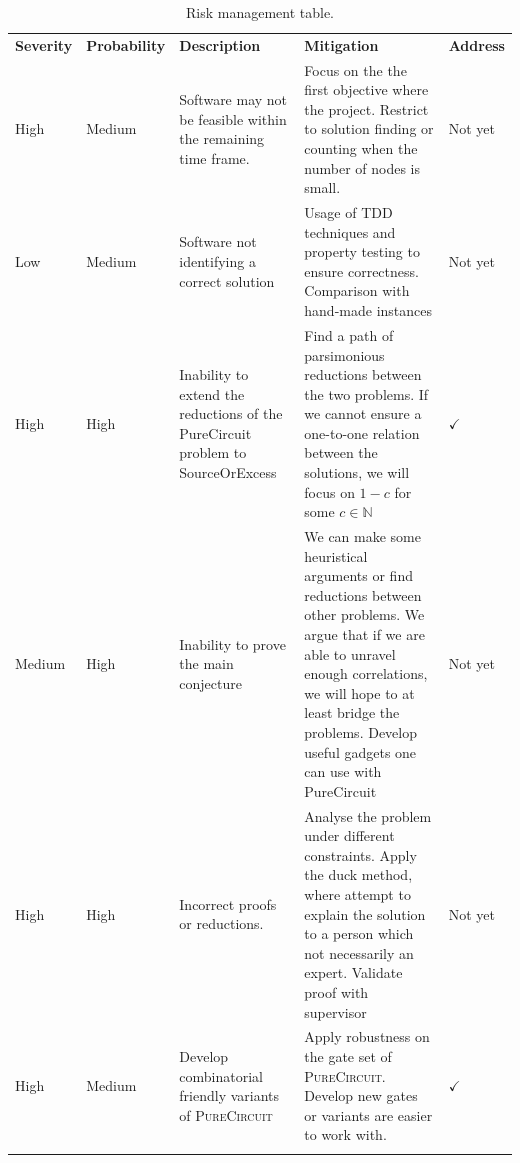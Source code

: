 \begin{xltabular}{0.95\linewidth}{|Z{1.2cm}|Z{1.75cm}|Y|Y|Z{1.2cm}|}
        \hline
        \textbf{Severity} & \textbf{Probability} & \textbf{Description} & \textbf{Mitigation} & \textbf{Address} \\
        \hhline{|=|=|=|=|=|}
        High   & Medium & Software may not be feasible within the remaining time frame. & Focus on the the first objective where the project. Restrict to solution finding or counting when the number of nodes is small. & Not yet      \\ \hline
        Low    & Medium & Software not identifying a correct solution & Usage of TDD techniques and property testing to ensure correctness.  Comparison with hand-made instances & Not yet      \\ \hline
        High   & High   & Inability to extend the reductions of the PureCircuit problem to SourceOrExcess & Find a path of parsimonious reductions between the two problems. If we cannot ensure a one-to-one relation between the solutions, we will focus on $1-c$ for some $c \in \mathbb{N}$  & $\checkmark$ \\ \hline
        Medium & High   & Inability to prove the main conjecture & We can make some heuristical arguments or find reductions between other problems. We argue that if we are able to unravel enough correlations, we will hope to at least bridge the problems. Develop useful gadgets one can use with PureCircuit & Not yet     \\ \hline
        High   & High   & Incorrect proofs or reductions. & Analyse the problem under different constraints. Apply the duck method, where attempt to explain the solution to a person which not necessarily an expert. Validate proof with supervisor & Not yet  \\ \hline
        High   & Medium & Develop combinatorial friendly variants of \textsc{PureCircuit} & Apply robustness on the gate set of \textsc{PureCircuit}. Develop new gates or variants are easier to work with.  & $\checkmark$  \\ \hline
        \caption{Risk management table.} \label{tab:management:risk-management}
\end{xltabular}

%
%

